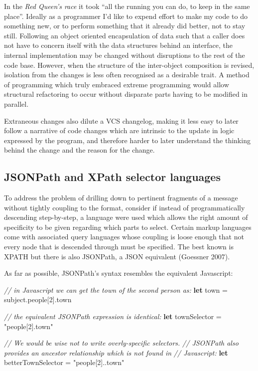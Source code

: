 \documentclass[12pt, ]{article}
\newenvironment{Shaded}{}{}
\newcommand{\KeywordTok}[1]{\textcolor[rgb]{0.00,0.44,0.13}{\textbf{{#1}}}}
\newcommand{\DecValTok}[1]{\textcolor[rgb]{0.25,0.63,0.44}{{#1}}}
\newcommand{\StringTok}[1]{\textcolor[rgb]{0.25,0.44,0.63}{{#1}}}
\newcommand{\CommentTok}[1]{\textcolor[rgb]{0.38,0.63,0.69}{\textit{{#1}}}}
\newcommand{\OtherTok}[1]{\textcolor[rgb]{0.00,0.44,0.13}{{#1}}}
\newcommand{\FunctionTok}[1]{\textcolor[rgb]{0.02,0.16,0.49}{{#1}}}
\newcommand{\NormalTok}[1]{{#1}}
\begin{document}
In the \emph{Red Queen's race} it took ``all the running you can do, to
keep in the same place''. Ideally as a programmer I'd like to expend
effort to make my code to do something new, or to perform something that
it already did better, not to stay still. Following an object oriented
encapsulation of data such that a caller does not have to concern itself
with the data structures behind an interface, the internal
implementation may be changed without disruptions to the rest of the
code base. However, when the structure of the inter-object composition
is revised, isolation from the changes is less often recognised as a
desirable trait. A method of programming which truly embraced extreme
programming would allow structural refactoring to occur without
disparate parts having to be modified in parallel.

Extraneous changes also dilute a VCS changelog, making it less easy to
later follow a narrative of code changes which are intrinsic to the
update in logic expressed by the program, and therefore harder to later
understand the thinking behind the change and the reason for the change.

\subsection{JSONPath and XPath selector
languages}\label{jsonpath-and-xpath-selector-languages}

\label{jsonpathxpath}

To address the problem of drilling down to pertinent fragments of a
message without tightly coupling to the format, consider if instead of
programmatically descending step-by-step, a language were used which
allows the right amount of specificity to be given regarding which parts
to select. Certain markup languages come with associated query languages
whose coupling is loose enough that not every node that is descended
through must be specified. The best known is XPATH but there is also
JSONPath, a JSON equivalent (Goessner 2007).

As far as possible, JSONPath's syntax resembles the equivalent
Javascript:

\begin{Shaded}
\begin{Highlighting}[]
\CommentTok{// in Javascript we can get the town of the second person as:}
\KeywordTok{let} \NormalTok{town = }\OtherTok{subject}\NormalTok{.}\FunctionTok{people}\NormalTok{[}\DecValTok{2}\NormalTok{].}\FunctionTok{town}

\CommentTok{// the equivalent JSONPath expression is identical:}
\KeywordTok{let} \NormalTok{townSelector = }\StringTok{"people[2].town"}

\CommentTok{// We would be wise not to write overly-specific selectors.}
\CommentTok{// JSONPath also provides an ancestor relationship which is not found in }
\CommentTok{// Javascript:}
\KeywordTok{let} \NormalTok{betterTownSelector = }\StringTok{"people[2]..town"}
\end{Highlighting}
\end{Shaded}
\end{document}
